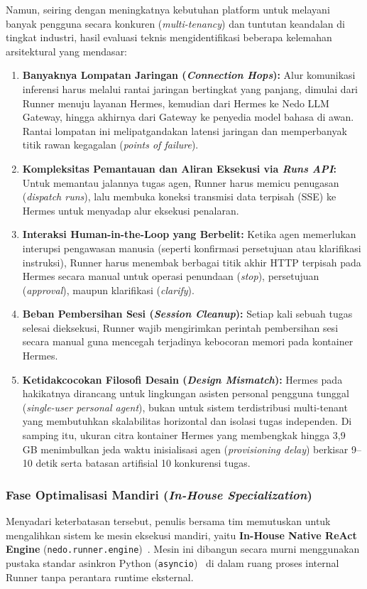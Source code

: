 Namun, seiring dengan meningkatnya kebutuhan platform untuk melayani banyak pengguna secara konkuren (\textit{multi-tenancy}) dan tuntutan keandalan di tingkat industri, hasil evaluasi teknis mengidentifikasi beberapa kelemahan arsitektural yang mendasar:
\begin{enumerate}[label=\alph*.]
  \item \textbf{Banyaknya Lompatan Jaringan (\textit{Connection Hops}):} Alur komunikasi inferensi harus melalui rantai jaringan bertingkat yang panjang, dimulai dari Runner menuju layanan Hermes, kemudian dari Hermes ke Nedo LLM Gateway, hingga akhirnya dari Gateway ke penyedia model bahasa di awan. Rantai lompatan ini melipatgandakan latensi jaringan dan memperbanyak titik rawan kegagalan (\textit{points of failure}).
  \item \textbf{Kompleksitas Pemantauan dan Aliran Eksekusi via \textit{Runs API}:} Untuk memantau jalannya tugas agen, Runner harus memicu penugasan (\textit{dispatch runs}), lalu membuka koneksi transmisi data terpisah (SSE) ke Hermes untuk menyadap alur eksekusi penalaran.
  \item \textbf{Interaksi Human-in-the-Loop yang Berbelit:} Ketika agen memerlukan interupsi pengawasan manusia (seperti konfirmasi persetujuan atau klarifikasi instruksi), Runner harus menembak berbagai titik akhir HTTP terpisah pada Hermes secara manual untuk operasi penundaan (\textit{stop}), persetujuan (\textit{approval}), maupun klarifikasi (\textit{clarify}).
  \item \textbf{Beban Pembersihan Sesi (\textit{Session Cleanup}):} Setiap kali sebuah tugas selesai dieksekusi, Runner wajib mengirimkan perintah pembersihan sesi secara manual guna mencegah terjadinya kebocoran memori pada kontainer Hermes.
  \item \textbf{Ketidakcocokan Filosofi Desain (\textit{Design Mismatch}):} Hermes pada hakikatnya dirancang untuk lingkungan asisten personal pengguna tunggal (\textit{single-user personal agent}), bukan untuk sistem terdistribusi multi-tenant yang membutuhkan skalabilitas horizontal dan isolasi tugas independen. Di samping itu, ukuran citra kontainer Hermes yang membengkak hingga 3,9 GB menimbulkan jeda waktu inisialisasi agen (\textit{provisioning delay}) berkisar 9--10 detik serta batasan artifisial 10 konkurensi tugas.
\end{enumerate}

\subsubsection{Fase Optimalisasi Mandiri (\textit{In-House Specialization})}
Menyadari keterbatasan tersebut, penulis bersama tim memutuskan untuk mengalihkan sistem ke mesin eksekusi mandiri, yaitu \textbf{In-House Native ReAct Engine} (\texttt{nedo.runner.engine})~\cite{yao2023react}. Mesin ini dibangun secara murni menggunakan pustaka standar asinkron Python (\texttt{asyncio})~\cite{python_asyncio} di dalam ruang proses internal Runner tanpa perantara runtime eksternal.

